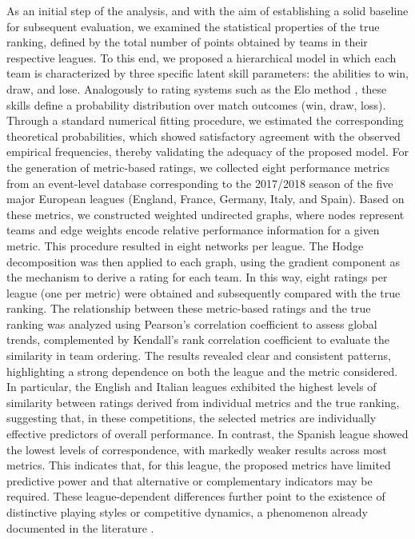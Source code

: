\documentclass[preprint, amsmath,amssymb, pre]{revtex4-2}
\begin{document}
As an initial step of the analysis, and with the aim of establishing a solid baseline for subsequent evaluation, we examined the statistical properties of the true ranking, defined by the total number of points obtained by teams in their respective leagues. To this end, we proposed a hierarchical model in which each team is characterized by three specific latent skill parameters: the abilities to win, draw, and lose. Analogously to rating systems such as the Elo method \cite{elo1978rating}, these skills define a probability distribution over match outcomes (win, draw, loss). Through a standard numerical fitting procedure, we estimated the corresponding theoretical probabilities, which showed satisfactory agreement with the observed empirical frequencies, thereby validating the adequacy of the proposed model.
%
For the generation of metric-based ratings, we collected eight performance metrics from an event-level database corresponding to the 2017/2018 season of the five major European leagues (England, France, Germany, Italy, and Spain). Based on these metrics, we constructed weighted undirected graphs, where nodes represent teams and edge weights encode relative performance information for a given metric. This procedure resulted in eight networks per league. The Hodge decomposition  was then applied to each graph, using the gradient component as the mechanism to derive a rating for each team. In this way, eight ratings per league (one per metric) were obtained and subsequently compared with the true ranking.
%
The relationship between these metric-based ratings and the true ranking was analyzed using Pearson’s correlation coefficient to assess global trends, complemented by Kendall’s rank correlation coefficient to evaluate the similarity in team ordering. The results revealed clear and consistent patterns, highlighting a strong dependence on both the league and the metric considered. In particular, the English and Italian leagues exhibited the highest levels of similarity between ratings derived from individual metrics and the true ranking, suggesting that, in these competitions, the selected metrics are individually effective predictors of overall performance. In contrast, the Spanish league showed the lowest levels of correspondence, with markedly weaker results across most metrics. This indicates that, for this league, the proposed metrics have limited predictive power and that alternative or complementary indicators may be required. These league-dependent differences further point to the existence of distinctive playing styles or competitive dynamics, a phenomenon already documented in the literature \cite{chacoma2025data}.
\end{document}
